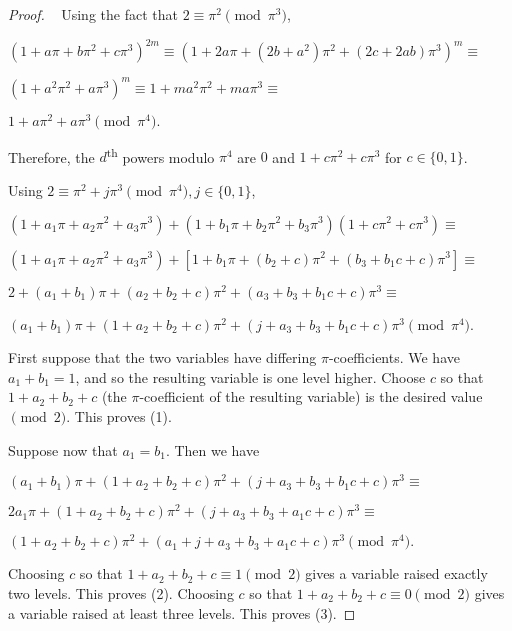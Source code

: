 \documentclass[12pt]{amsart}
\begin{document}
\begin{proof}~
Using the fact that $2 \equiv \pi^2 \pmod{\pi^3}$,

\smallskip

$(1 + a\pi + b\pi^2 + c\pi^3)^{2m} \equiv (1 + 2a\pi + (2b+a^2)\pi^2 + (2c + 2ab)\pi^3)^m \equiv$

$(1 + a^2\pi^2 + a\pi^3)^m \equiv 1 + ma^2\pi^2 + ma\pi^3 \equiv$

$1 + a\pi^2 + a\pi^3 \pmod{\pi^4}.$

Therefore, the $d$\textsuperscript{th} powers modulo $\pi^4$ are $0$ and $1 + c\pi^2 + c\pi^3$ for $c \in \{0,1\}$.

\bigskip

Using $2 \equiv \pi^2 + j\pi^3 \pmod{\pi^4}, j \in \{0, 1\}$,

\smallskip

$(1 + a_1\pi + a_2\pi^2 + a_3\pi^3) + (1 + b_1\pi + b_2\pi^2 + b_3\pi^3)(1 + c\pi^2 + c\pi^3) \equiv $

$(1 + a_1\pi + a_2\pi^2 + a_3\pi^3) + [1 + b_1\pi + (b_2 + c)\pi^2 + (b_3 + b_1c + c)\pi^3] \equiv$

$2 + (a_1 + b_1)\pi + (a_2 + b_2 + c)\pi^2 + (a_3 + b_3 + b_1c + c)\pi^3 \equiv$

$(a_1 + b_1)\pi + (1 + a_2 + b_2 + c)\pi^2 + (j + a_3 + b_3 + b_1c + c)\pi^3 \pmod{\pi^4}$.

\bigskip

First suppose that the two variables have differing $\pi$-coefficients.  We have $a_1 + b_1 = 1$, and so the resulting variable is one level higher.  Choose $c$ so that $1 + a_2 + b_2 + c$ (the $\pi$-coefficient of the resulting variable) is the desired value $\pmod{2}$.  This proves (1).

\bigskip

Suppose now that $a_1 = b_1$.  Then we have

\smallskip

$(a_1 + b_1)\pi + (1 + a_2 + b_2 + c)\pi^2 + (j + a_3 + b_3 + b_1c + c)\pi^3 \equiv$

$2a_1\pi + (1 + a_2 + b_2 + c)\pi^2 + (j + a_3 + b_3 + a_1c + c)\pi^3 \equiv$

$(1 + a_2 + b_2 + c)\pi^2 + (a_1 + j + a_3 + b_3 + a_1c + c)\pi^3 \pmod{\pi^4}.$

\smallskip

Choosing $c$ so that $1 + a_2 + b_2 + c \equiv 1 \pmod{2}$ gives a variable raised exactly two levels.  This proves (2).  Choosing $c$ so that $1 + a_2 + b_2 + c \equiv 0 \pmod{2}$ gives a variable raised at least three levels.  This proves (3).


\end{proof}
\end{document}
